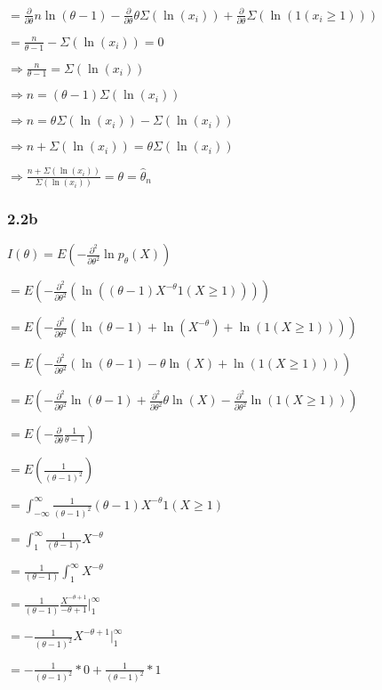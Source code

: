 \documentclass[
]{article}
\begin{document}
\(= \frac{\partial}{\partial \theta} n \ln(\theta-1) - \frac{\partial}{\partial \theta} \theta \Sigma(\ln(x_i)) + \frac{\partial}{\partial \theta} \Sigma(\ln(1(x_i \geq 1)))\)

\(= \frac{n}{\theta-1} - \Sigma(\ln(x_i)) = 0\)

\(\Longrightarrow \frac{n}{\theta-1} = \Sigma(\ln(x_i))\)

\(\Longrightarrow n = (\theta-1)\Sigma(\ln(x_i))\)

\(\Longrightarrow n = \theta\Sigma(\ln(x_i)) - \Sigma(\ln(x_i))\)

\(\Longrightarrow n + \Sigma(\ln(x_i)) = \theta\Sigma(\ln(x_i))\)

\(\Longrightarrow \frac{n + \Sigma(\ln(x_i))}{\Sigma(\ln(x_i))} = \theta = \hat{\theta}_n\)

\hypertarget{b}{%
\subsubsection{2.2b}\label{b}}

\(I(\theta) = E(-\frac{\partial^2}{\partial \theta^2} \ln p_{\theta}(X))\)

\(= E(-\frac{\partial^2}{\partial \theta^2} (\ln((\theta-1)X^{-\theta}1(X \geq 1))))\)

\(= E(-\frac{\partial^2}{\partial \theta^2} (\ln(\theta-1) + \ln(X^{-\theta}) + \ln(1(X \geq 1))))\)

\(= E(-\frac{\partial^2}{\partial \theta^2} (\ln(\theta-1) - \theta \ln(X) + \ln(1(X \geq 1))))\)

\(= E(-\frac{\partial^2}{\partial \theta^2} \ln(\theta-1) + \frac{\partial^2}{\partial \theta^2}\theta \ln(X) - \frac{\partial^2}{\partial \theta^2}\ln(1(X \geq 1)))\)

\(= E(-\frac{\partial}{\partial \theta} \frac{1}{\theta-1})\)

\(= E(\frac{1}{(\theta-1)^2})\)

\(=\int_{-\infty}^{\infty} \frac{1}{(\theta-1)^2} (\theta-1)X^{-\theta}1(X \geq 1)\)

\(=\int_{1}^{\infty} \frac{1}{(\theta-1)}X^{-\theta}\)

\(=\frac{1}{(\theta-1)} \int_{1}^{\infty} X^{-\theta}\)

\(=\frac{1}{(\theta-1)} \frac{X^{-\theta+1}}{-\theta+1}\vert_{1}^{\infty}\)

\(= -\frac{1}{(\theta-1)^2} X^{-\theta+1}\vert_{1}^{\infty}\)

\(= -\frac{1}{(\theta-1)^2} * 0 + \frac{1}{(\theta-1)^2} * 1\)
\end{document}
